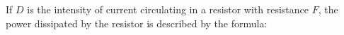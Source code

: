 If $D$ is the intensity of current circulating in a resistor with resistance $F$, 
the power dissipated by the resistor is described by the formula: 